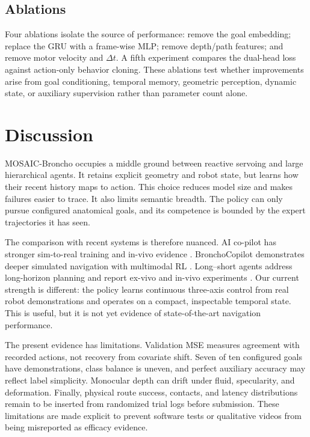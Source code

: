 \documentclass[letterpaper,10pt,conference]{ieeeconf}
\begin{document}
\subsection{Ablations}

Four ablations isolate the source of performance: remove the goal embedding;
replace the GRU with a frame-wise MLP; remove depth/path features; and remove
motor velocity and $\Delta t$. A fifth experiment compares the dual-head loss
against action-only behavior cloning. These ablations test whether improvements
arise from goal conditioning, temporal memory, geometric perception, dynamic
state, or auxiliary supervision rather than parameter count alone.

\section{Discussion}

MOSAIC-Broncho occupies a middle ground between reactive servoing and large
hierarchical agents. It retains explicit geometry and robot state, but learns
how their recent history maps to action. This choice reduces model size and
makes failures easier to trace. It also limits semantic breadth. The policy can
only pursue configured anatomical goals, and its competence is bounded by the
expert trajectories it has seen.

The comparison with recent systems is therefore nuanced. AI co-pilot has
stronger sim-to-real training and in-vivo evidence \cite{zhang2024aicopilot}.
BronchoCopilot demonstrates deeper simulated navigation with multimodal RL
\cite{zhao2024bronchocopilot}. Long--short agents address long-horizon planning
and report ex-vivo and in-vivo experiments \cite{wu2026longshort}. Our current
strength is different: the policy learns continuous three-axis control from
real robot demonstrations and operates on a compact, inspectable temporal
state. This is useful, but it is not yet evidence of state-of-the-art navigation
performance.

The present evidence has limitations. Validation MSE measures agreement with
recorded actions, not recovery from covariate shift. Seven of ten configured
goals have demonstrations, class balance is uneven, and perfect auxiliary
accuracy may reflect label simplicity. Monocular depth can drift under fluid,
specularity, and deformation. Finally, physical route success, contacts, and
latency distributions remain to be inserted from randomized trial logs before
submission. These limitations are made explicit to prevent software tests or
qualitative videos from being misreported as efficacy evidence.
\end{document}
